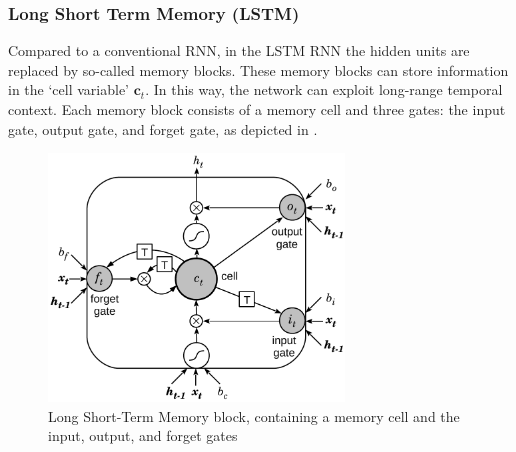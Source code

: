 \subsubsection{Long Short Term Memory (LSTM)} Compared to a conventional RNN, in the LSTM RNN \cite{Hochreiter97-LST} the hidden units are replaced by so-called memory blocks.
These memory blocks can store information in the `cell variable' $\boldsymbol{c}_t$.
In this way, the network can exploit long-range temporal context.
Each memory block consists of a memory cell and three gates: the input gate, output gate, and forget gate, as depicted in .

\begin{figure}[h]
	\centering
	\includegraphics[width=0.7\textwidth]{img/lstm}
	\caption[LSTM]{Long Short-Term Memory block, containing a memory cell and the input, output, and forget gates}
	\label{fig:lstm}
\end{figure}

